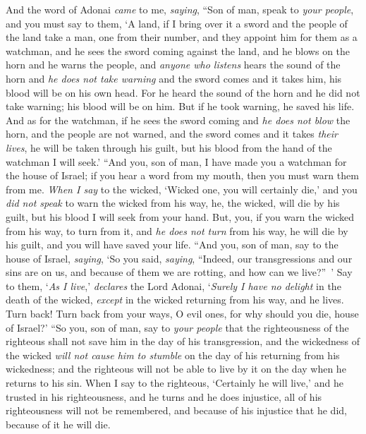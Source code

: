 \begin{biblechapter} %
 And the word of Adonai \textit{came} to me, \textit{saying},
\verse “Son of man, speak to \textit{your people}, and you must say to them, ‘A land, if I bring over it a sword and the people of the land take a man, one from their number, and they appoint him for them as a watchman,
\verse and he sees the sword coming against the land, and he blows on the horn and he warns the people,
\verse and \textit{anyone who listens} hears the sound of the horn and \textit{he does not take warning} and the sword comes and it takes him, his blood will be on his own head.
\verse For he heard the sound of the horn and he did not take warning; his blood will be on him. But if he took warning, he saved his life.
\verse And as for the watchman, if he sees the sword coming and \textit{he does not blow} the horn, and the people are not warned, and the sword comes and it takes \textit{their lives}, he will be taken through his guilt, but his blood from the hand of the watchman I will seek.’
\verse “And you, son of man, I have made you a watchman for the house of Israel; if you hear a word from my mouth, then you must warn them from me.
\verse \textit{When I say} to the wicked, ‘Wicked one, you will certainly die,’ and you \textit{did not speak} to warn the wicked from his way, he, the wicked, will die by his guilt, but his blood I will seek from your hand.
\verse But, you, if you warn the wicked from his way, to turn from it, and \textit{he does not turn} from his way, he will die by his guilt, and you will have saved your life.
\verse “And you, son of man, say to the house of Israel, \textit{saying}, ‘So you said, \textit{saying}, “Indeed, our transgressions and our sins are on us, and because of them we are rotting, and how can we live?” ’
\verse Say to them, ‘\textit{As I live},’ \textit{declares} the Lord Adonai, ‘\textit{Surely I have no delight} in the death of the wicked, \textit{except} in the wicked returning from his way, and he lives. Turn back! Turn back from your ways, O evil ones, for why should you die, house of Israel?’
\verse “So you, son of man, say to \textit{your people} that the righteousness of the righteous shall not save him in the day of his transgression, and the wickedness of the wicked \textit{will not cause him to stumble} on the day of his returning from his wickedness; and the righteous will not be able to live by it on the day when he returns to his sin.
\verse When I say to the righteous, ‘Certainly he will live,’ and he trusted in his righteousness, and he turns and he does injustice, all of his righteousness will not be remembered, and because of his injustice that he did, because of it he will die.

\end{biblechapter}
